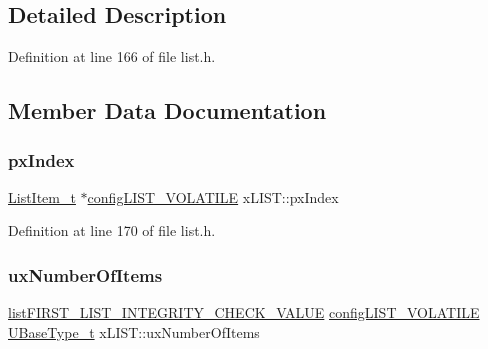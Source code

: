 \subsection{Detailed Description}


Definition at line 166 of file list.\+h.



\subsection{Member Data Documentation}
\mbox{\label{structx_l_i_s_t_a79e84e9d83977d423508cb59d9629166}} 
\subsubsection{\texorpdfstring{px\+Index}{pxIndex}}
{\footnotesize\ttfamily \hyperlink{externals_2freertos_2include_2list_8h_a1a62d469392f9bfe2443e7efab9c8398}{List\+Item\+\_\+t} $\ast$\hyperlink{vendor_2ceedling_2plugins_2freertos_2vendor_2freertos_2include_2list_8h_a2d5de557c5561c8980d1bf51d87d8cba}{config\+L\+I\+S\+T\+\_\+\+V\+O\+L\+A\+T\+I\+LE} x\+L\+I\+S\+T\+::px\+Index}



Definition at line 170 of file list.\+h.

\mbox{\label{structx_l_i_s_t_aa5cb7cdc699e1252af0441e46e427a03}} 
\subsubsection{\texorpdfstring{ux\+Number\+Of\+Items}{uxNumberOfItems}\hspace{0.1cm}{\footnotesize\ttfamily [1/2]}}
{\footnotesize\ttfamily \hyperlink{vendor_2ceedling_2plugins_2freertos_2vendor_2freertos_2include_2list_8h_a3a52b5a4f70d3a07e37a5814a23ba880}{list\+F\+I\+R\+S\+T\+\_\+\+L\+I\+S\+T\+\_\+\+I\+N\+T\+E\+G\+R\+I\+T\+Y\+\_\+\+C\+H\+E\+C\+K\+\_\+\+V\+A\+L\+UE} \hyperlink{vendor_2ceedling_2plugins_2freertos_2vendor_2freertos_2include_2list_8h_a2d5de557c5561c8980d1bf51d87d8cba}{config\+L\+I\+S\+T\+\_\+\+V\+O\+L\+A\+T\+I\+LE} \hyperlink{externals_2freertos_2portable_2_g_c_c_2_a_r_m___c_m0_2portmacro_8h_a646f89d4298e4f5afd522202b11cb2e6}{U\+Base\+Type\+\_\+t} x\+L\+I\+S\+T\+::ux\+Number\+Of\+Items}



